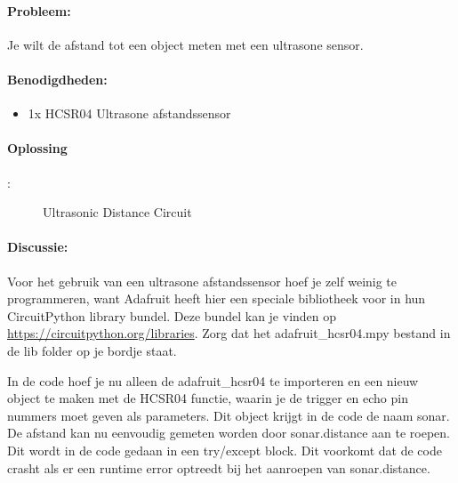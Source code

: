 	\paragraph{Probleem:} Je wilt de afstand tot een object meten met een ultrasone sensor.
	\paragraph{Benodigdheden:}
	\begin{itemize}
		\item 1x HCSR04 Ultrasone afstandssensor
	\end{itemize}
	\paragraph{Oplossing}:
	\begin{figure}[H]
		\caption{Ultrasonic Distance Circuit}
		\label{fig:UltrasonicDistance}
	\end{figure}

	
	\newpage
	
	\paragraph{Discussie:} Voor het gebruik van een ultrasone afstandssensor hoef je zelf weinig te programmeren, want Adafruit heeft hier een speciale bibliotheek voor in hun CircuitPython library bundel. Deze bundel kan je vinden op \url{https://circuitpython.org/libraries}. Zorg dat het adafruit\_hcsr04.mpy bestand in de lib folder op je bordje staat. 
	
	In de code hoef je nu alleen de adafruit\_hcsr04 te importeren en een nieuw object te maken met de HCSR04 functie, waarin je de trigger en echo pin nummers moet geven als parameters. Dit object krijgt in de code de naam sonar. De afstand kan nu eenvoudig gemeten worden door sonar.distance aan te roepen. Dit wordt in de code gedaan in een try/except block. Dit voorkomt dat de code crasht als er een runtime error optreedt bij het aanroepen van sonar.distance.
	
